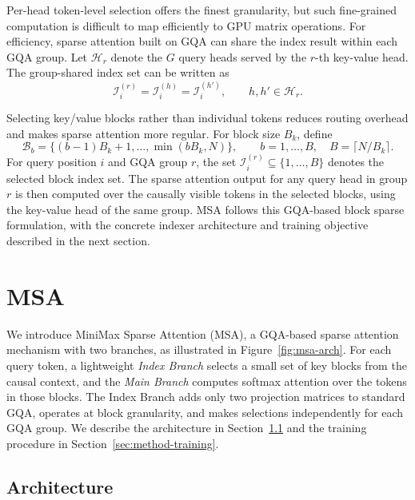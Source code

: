 \documentclass{llmxive}
\providecommand{\method}{\textsc{MSA}}
\providecommand{\Figref}[1]{Figure~\ref{#1}}
\providecommand{\Secref}[1]{Section~\ref{#1}}
\providecommand{\gB}{{\mathcal{B}}}
\providecommand{\gI}{{\mathcal{I}}}
\begin{document}
Per-head token-level selection offers the finest granularity, but such fine-grained computation is difficult to map efficiently to GPU matrix operations. For efficiency, sparse attention built on GQA can share the index result within each GQA group. Let $\mathcal{H}_r$ denote the $G$ query heads served by the $r$-th key-value head. The group-shared index set can be written as
\begin{equation}
\label{eq:prelim-group-shared-support}
    \gI_i^{(r)} = \gI_i^{(h)} = \gI_i^{(h')},
    \qquad
    h,h' \in \mathcal{H}_r .
\end{equation}

Selecting key/value blocks rather than individual tokens reduces routing overhead and makes sparse attention more regular. For block size $B_k$, define
\begin{equation}
\label{eq:prelim-key-blocks}
    \gB_b
    =
    \{(b{-}1)B_k+1,\dots,\min(bB_k,N)\},
    \qquad
    b=1,\dots,B,\quad B=\lceil N/B_k\rceil .
\end{equation}
For query position $i$ and GQA group $r$, the set $\gI_i^{(r)} \subseteq \{1,\dots,B\}$ denotes the selected block index set.
The sparse attention output for any query head in group $r$ is then computed over the causally visible tokens in the selected blocks, using the key-value head of the same group. \method{} follows this GQA-based block sparse formulation, with the concrete indexer architecture and training objective described in the next section.

\section{\method{}}
\label{sec:method}

We introduce MiniMax Sparse Attention (\method{}), a GQA-based sparse attention mechanism with two branches, as illustrated in \Figref{fig:msa-arch}. For each query token, a lightweight \emph{Index Branch} selects a small set of key blocks from the causal context, and the \emph{Main Branch} computes softmax attention over the tokens in those blocks. The Index Branch adds only two projection matrices to standard GQA, operates at block granularity, and makes selections independently for each GQA group. We describe the architecture in \Secref{sec:method-architecture} and the training procedure in \Secref{sec:method-training}.



\subsection{Architecture}
\label{sec:method-architecture}
\end{document}

